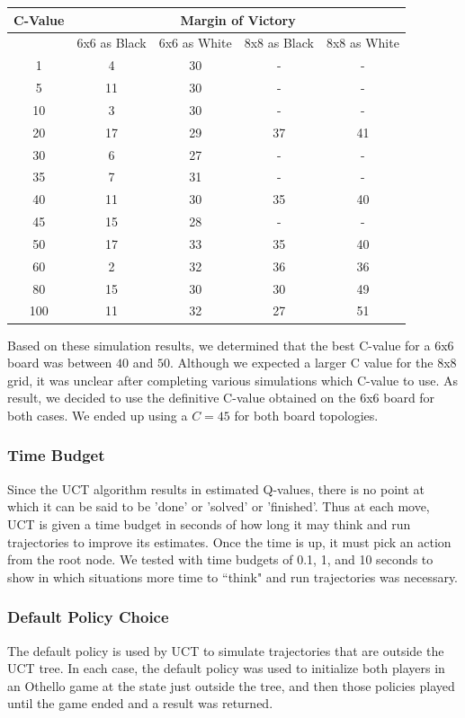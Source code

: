 \documentclass[12pt,letterpaper]{article}
\begin{document}
\begin{tabular}{|c|c|c|c|c|}
\hline
C-Value & \multicolumn{4}{c|}{Margin of Victory}\\
\hline 
 & 6x6 as Black & 6x6 as White & 8x8 as Black & 8x8 as White \\ 
\hline 
1 & 4 & 30 & - & - \\ 
\hline 
5 & 11 & 30 & - & - \\ 
\hline 
10 & 3 & 30 & - & - \\ 
\hline 
20 & 17 & 29 & 37 & 41 \\ 
\hline 
30 & 6 & 27 & - & - \\ 
\hline 
35 & 7 & 31 & - & - \\ 
\hline 
40 & 11 & 30 & 35 & 40 \\ 
\hline 
45 & 15 & 28 & - & - \\ 
\hline 
50 & 17 & 33 & 35 & 40 \\ 
\hline 
60 & 2 & 32 & 36 & 36 \\ 
\hline 
80 & 15 & 30 & 30 & 49 \\ 
\hline 
100 & 11 & 32 & 27 & 51 \\ 
\hline 
\end{tabular} 

Based on these simulation results, we determined that the best C-value for a 6x6 board was between $40$ and $50$. Although we expected a larger C value for the 8x8 grid, it was unclear after completing various simulations which C-value to use. As result, we decided to use the definitive C-value obtained on the 6x6 board for both cases.  We ended up using a $C=45$ for both board topologies.

\subsubsection{Time Budget}
Since the UCT algorithm results in estimated Q-values, there is no point at which it can be said to be 'done' or 'solved' or 'finished'. Thus at each move, UCT is given a time budget in seconds of how long it may think and run trajectories to improve its estimates. Once the time is up, it must pick an action from the root node. We tested with time budgets of 0.1, 1, and 10 seconds to show in which situations more time to ``think" and run trajectories was necessary.

\subsubsection{Default Policy Choice}
The default policy is used by UCT to simulate trajectories that are outside the UCT tree. In each case, the default policy was used to initialize both players in an Othello game at the state just outside the tree, and then those policies played until the game ended and a result was returned.
\end{document}
